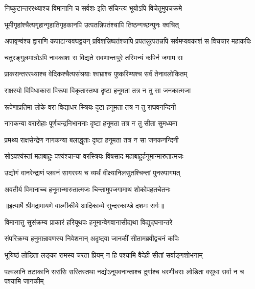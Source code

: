 \twolineshloka
{निष्कुटान्तररथ्याश्च विमानानि च सर्वशः}
{इति संचिन्त्य भूयोऽपि विचेतुमुपचक्रमे} %

\twolineshloka
{भूमीगृहांश्चैत्यगृहान्गृहातिगृहकानपि}
{उत्पतन्निपतंश्चापि तिष्ठन्गच्छन्पुनः क्वचित्} %

\threelineshloka
{अपावृण्वंश्च द्वाराणि कपाटान्यवघट्टयन्}
{प्रविशन्निष्पतंश्चापि प्रपतन्नुत्पतन्नपि}
{सर्वमप्यवकाशं स विचचार महाकपिः} %

\twolineshloka
{चतुरङ्गुलमात्रोऽपि नावकाशः स विद्यते}
{रावणान्तःपुरे तस्मिन्यं कपिर्न जगाम सः} %

\twolineshloka
{प्राकरान्तररथ्याश्च वेदिकश्चैत्यसंश्रयाः}
{श्वभ्राश्च पुष्करिण्यश्च सर्वं तेनावलोकितम्} %

\twolineshloka
{राक्षस्यो विविधाकारा विरूपा विकृतास्तथा}
{दृष्टा हनूमता तत्र न तु सा जनकात्मजा} %

\twolineshloka
{रूपेणाप्रतिमा लोके वरा विद्याधर स्त्रियः}
{दृटा हनूमता तत्र न तु राघवनन्दिनी} %

\twolineshloka
{नागकन्या वरारोहाः पूर्णचन्द्रनिभाननाः}
{दृष्टा हनूमता तत्र न तु सीता सुमध्यमा} %

\twolineshloka
{प्रमथ्य राक्षसेन्द्रेण नागकन्या बलाद्धृताः}
{दृष्टा हनूमता तत्र न सा जनकनन्दिनी} %

\twolineshloka
{सोऽपश्यंस्तां महाबाहुः पश्यंश्चान्या वरस्त्रियः}
{विषसाद महाबाहुर्हनूमान्मारुतात्मजः} %

\twolineshloka
{उद्योगं वानरेन्द्राणं प्लवनं सागरस्य च}
{व्यर्थं वीक्ष्यानिलसुतश्चिन्तां पुनरुपागमत्} %

\twolineshloka
{अवतीर्य विमानाच्च हनूमान्मारुतात्मजः}
{चिन्तामुपजगामाथ शोकोपहतचेतनः} %


{॥इत्यार्षे श्रीमद्रामायणे वाल्मीकीये आदिकाव्ये सुन्दरकाण्डे दशमः सर्गः॥}


\twolineshloka
{विमानात्तु सुसंक्रम्य प्राकारं हरियूथपः}
{हनूमान्वेगवानासीद्यथा विद्युद्घनान्तरे} %

\twolineshloka
{संपरिक्रम्य हनुमान्रावणस्य निवेशनान्}
{अदृष्ट्वा जानकीं सीतामब्रवीद्वचनं कपिः} %

\twolineshloka
{भूयिष्ठं लोडिता लङ्का रामस्य चरता प्रियम्}
{न हि पश्यामि वैदेहीं सीतां सर्वाङ्गशोभनाम्} %

\threelineshloka
{पल्वलानि तटाकानि सरांसि सरितस्तथा}
{नद्योऽनूपवनान्ताश्च दुर्गाश्च धरणीधराः}
{लोडिता वसुधा सर्वा न च पश्यामि जानकीम्} %

